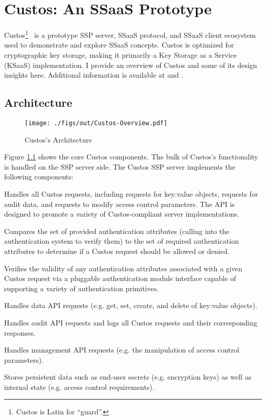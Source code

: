 \chapter{Custos: An SSaaS Prototype}
\label{chap:custos}

Custos\footnote{Custos is Latin for ``guard''.}~\cite{custos-trios,
  custos-masters} is a prototype SSP server, SSaaS protocol, and SSaaS
client ecosystem used to demonstrate and explore SSaaS
concepts. Custos is optimized for cryptographic key storage, making it
primarily a Key Storage as a Service (KSaaS) implementation. I provide
an overview of Custos and some of its design insights here. Additional
information is available at \cite{custos-masters} and
\cite{custos-trios}.

\section{Architecture}
\label{chap:custos:arch}

\begin{figure}[t]
  \centering
  \texttt{[image: ./figs/out/Custos-Overview.pdf]}
  \caption{Custos's Architecture}
  \label{fig:custos-overview}
\end{figure}

Figure \ref{fig:custos-overview} shows the core Custos components. The
bulk of Custos's functionality is handled on the SSP server side. The
Custos SSP server implements the following components:

\begin{packed_desc}
\item[API] Handles all Custos requests, including requests for
  key:value objects, requests for audit data, and requests to modify
  access control parameters. The API is designed to promote a variety
  of Custos-compliant server implementations.
\item[Access Control] Compares the set of provided authentication
  attributes (calling into the authentication system to verify them)
  to the set of required authentication attributes to determine if a
  Custos request should be allowed or denied.
\item[Authentication] Verifies the validity of any authentication
  attributes associated with a given Custos request via a pluggable
  authentication module interface capable of supporting a variety of
  authentication primitives.
\item[Data] Handles data API requests (e.g. get, set, create, and
  delete of key:value objects).
\item[Auditing] Handles audit API requests and logs all Custos
  requests and their corresponding responses.
\item[Management] Handles management API requests (e.g. the
  manipulation of access control parameters).
\item[Key-Value Secret Store] Stores persistent data such as end-user
  secrets (e.g. encryption keys) as well as internal state
  (e.g. access control requirements).
\end{packed_desc}

